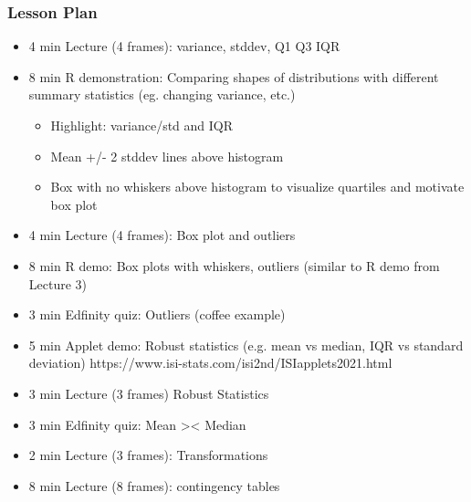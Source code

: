 \begin{frame}
    \frametitle{Lesson Plan}
    \begin{itemize}
        \item 4 min Lecture (4 frames): variance, stddev, Q1 Q3 IQR
        \item 8 min R demonstration: Comparing shapes of distributions with different summary statistics (eg. changing variance, etc.)
        \begin{itemize}
            \item Highlight: variance/std and IQR
            \item Mean +/- 2 stddev lines above histogram
            \item Box with no whiskers above histogram to visualize quartiles and motivate box plot
         \end{itemize}

        \item 4 min Lecture (4 frames): Box plot and outliers
        \item 8 min R demo: Box plots with whiskers, outliers (similar to R demo from Lecture 3)
        \item 3 min Edfinity quiz: Outliers (coffee example)
        \item 5 min Applet demo: Robust statistics (e.g. mean vs median, IQR vs standard deviation) https://www.isi-stats.com/isi2nd/ISIapplets2021.html
        \item 3 min Lecture (3 frames) Robust Statistics 
        \item 3 min Edfinity quiz: Mean >< Median
        \item 2 min Lecture (3 frames): Transformations
        \item 8 min Lecture (8 frames): contingency tables
    \end{itemize}
\end{frame}


